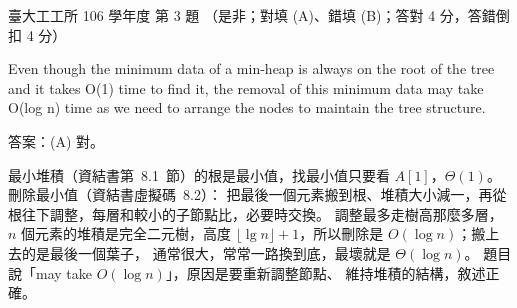 \begin{pastexam}[label={px:ntu-106-ie-ds-03}]{臺大工工所 106 學年度 第 3 題}
（是非；對填 (A)、錯填 (B)；答對 4 分，答錯倒扣 4 分）

Even though the minimum data of a min-heap is always on the root of the tree and it takes O(1) time to
find it, the removal of this minimum data may take O(log n) time as we need to arrange the nodes to
maintain the tree structure.
\end{pastexam}

\begin{pastsoln}
答案：(A) 對。

最小堆積（資結書第~8.1~節）的根是最小值，找最小值只要看 $A[1]$，$\Theta(1)$。 刪除最小值（資結書虛擬碼~8.2）：
把最後一個元素搬到根、堆積大小減一，再從根往下調整，每層和較小的子節點比，必要時交換。 調整最多走樹高那麼多層，
$n$ 個元素的堆積是完全二元樹，高度 $\lfloor \lg n \rfloor + 1$，所以刪除是 $O(\log n)$；搬上去的是最後一個葉子，
通常很大，常常一路換到底，最壞就是 $\Theta(\log n)$。 題目說「may take $O(\log n)$」，原因是要重新調整節點、
維持堆積的結構，敘述正確。
\end{pastsoln}
